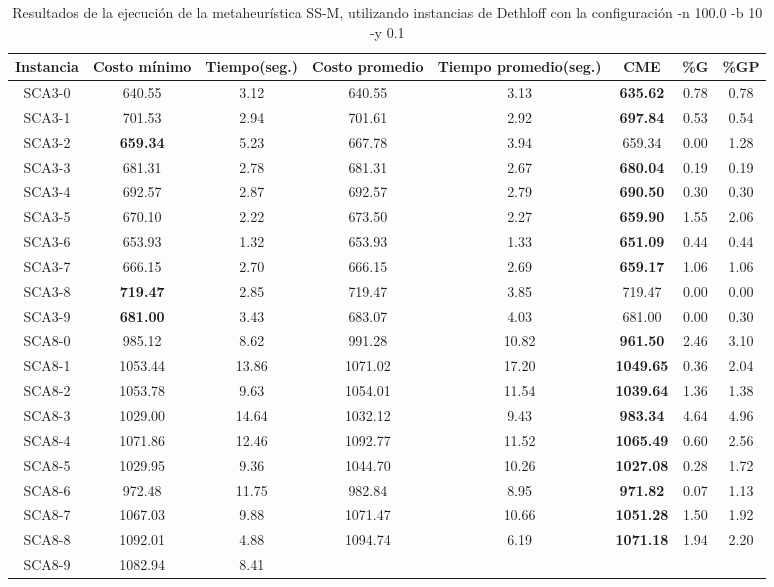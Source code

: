 \begin{table}[h]
\caption{Resultados de la ejecución de la metaheurística SS-M, utilizando instancias de Dethloff con la configuración -n 100.0 -b 10 -y 0.1}
\centering
\small
\begin{tabular}{c c c c c c c c}
\hline\hline
Instancia & Costo mínimo & Tiempo(seg.) & Costo promedio & Tiempo promedio(seg.) & CME & \%G & \%GP \\ [0.5ex]
\hline
SCA3-0 & 640.55 & 3.12 & 
640.55 & 3.13 & \bf{635.62} & 
0.78 & 0.78\\SCA3-1 & 701.53 & 2.94 & 
701.61 & 2.92 & \bf{697.84} & 
0.53 & 0.54\\SCA3-2 & \bf{659.34} & 5.23 & 
667.78 & 3.94 & 659.34 & 0.00
 & 1.28\\SCA3-3 & 681.31 & 2.78 & 
681.31 & 2.67 & \bf{680.04} & 
0.19 & 0.19\\SCA3-4 & 692.57 & 2.87 & 
692.57 & 2.79 & \bf{690.50} & 
0.30 & 0.30\\SCA3-5 & 670.10 & 2.22 & 
673.50 & 2.27 & \bf{659.90} & 
1.55 & 2.06\\SCA3-6 & 653.93 & 1.32 & 
653.93 & 1.33 & \bf{651.09} & 
0.44 & 0.44\\SCA3-7 & 666.15 & 2.70 & 
666.15 & 2.69 & \bf{659.17} & 
1.06 & 1.06\\SCA3-8 & \bf{719.47} & 2.85 & 
719.47 & 3.85 & 719.47 & 0.00
 & 0.00\\
SCA3-9 & \bf{681.00} & 3.43 & 
683.07 & 4.03 & 681.00 & 0.00
 & 0.30\\SCA8-0 & 985.12 & 8.62 & 
991.28 & 10.82 & \bf{961.50} & 
2.46 & 3.10\\SCA8-1 & 1053.44 & 13.86 & 
1071.02 & 17.20 & \bf{1049.65} & 
0.36 & 2.04\\SCA8-2 & 1053.78 & 9.63 & 
1054.01 & 11.54 & \bf{1039.64} & 
1.36 & 1.38\\SCA8-3 & 1029.00 & 14.64 & 
1032.12 & 9.43 & \bf{983.34} & 
4.64 & 4.96\\SCA8-4 & 1071.86 & 12.46 & 
1092.77 & 11.52 & \bf{1065.49} & 
0.60 & 2.56\\SCA8-5 & 1029.95 & 9.36 & 
1044.70 & 10.26 & \bf{1027.08} & 
0.28 & 1.72\\SCA8-6 & 972.48 & 11.75 & 
982.84 & 8.95 & \bf{971.82} & 
0.07 & 1.13\\SCA8-7 & 1067.03 & 9.88 & 
1071.47 & 10.66 & \bf{1051.28} & 
1.50 & 1.92\\SCA8-8 & 1092.01 & 4.88 & 
1094.74 & 6.19 & \bf{1071.18} & 
1.94 & 2.20\\SCA8-9 & 1082.94 & 8.41 & 

\end{tabular}
\end{table}
